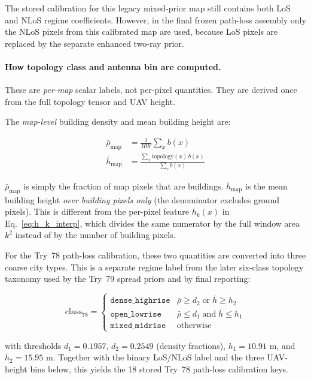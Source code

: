 The stored calibration for this legacy mixed-prior map still contains both LoS
and NLoS regime coefficients. However, in the final frozen
path-loss assembly only the NLoS pixels from this calibrated map are used,
because LoS pixels are replaced by the separate enhanced two-ray
prior.

\paragraph{How topology class and antenna bin are computed.}
These are \emph{per-map} scalar labels, not per-pixel quantities.
They are derived once from the full topology tensor and UAV height.

The \emph{map-level} building density and mean building height are:

\begin{align}
\bar\rho_{\mathrm{map}}
&= \frac{1}{HW}\sum_{x} b(x)
\label{eq:global_density}\\[4pt]
\bar h_{\mathrm{map}}
&= \frac{\displaystyle\sum_{x} \mathrm{topology}(x)\,b(x)}
        {\displaystyle\sum_{x} b(x)}
\label{eq:global_mean_bldg_height}
\end{align}

$\bar\rho_{\mathrm{map}}$ is simply the fraction of map pixels that are
buildings. $\bar h_{\mathrm{map}}$ is the mean building height
\emph{over building pixels only} (the denominator excludes ground pixels).
This is different from the per-pixel feature $h_k(x)$ in
Eq.~\eqref{eq:h_k_interp}, which divides the same numerator by the full
window area $k^2$ instead of by the number of building pixels.

For the Try~78 path-loss calibration, these two quantities are converted into
three coarse city types. This is a separate regime label from the later
six-class topology taxonomy used by the Try~79 spread priors and by final
reporting:

\begin{equation}
\mathrm{class}_{78} =
\begin{cases}
\texttt{dense\_highrise} & \bar\rho \ge d_2\;\text{or}\;\bar h \ge h_2 \\
\texttt{open\_lowrise} & \bar\rho \le d_1\;\text{and}\;\bar h \le h_1 \\
\texttt{mixed\_midrise} & \text{otherwise}
\end{cases}
\label{eq:topo78}
\end{equation}

with thresholds $d_1 = 0.1957$, $d_2 = 0.2549$ (density fractions),
$h_1 = 10.91$ m, and $h_2 = 15.95$ m. Together with the binary LoS/NLoS
label and the three UAV-height bins below, this yields the 18 stored Try~78
path-loss calibration keys.

